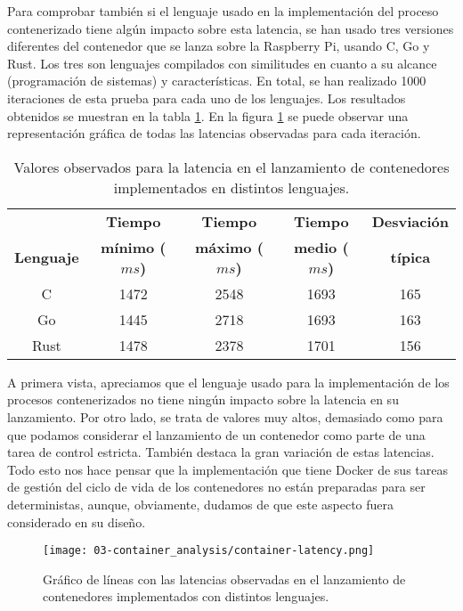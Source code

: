 Para comprobar también si el lenguaje usado en la implementación del proceso
contenerizado tiene algún impacto sobre esta latencia, se han usado tres
versiones diferentes del contenedor que se lanza sobre la Raspberry Pi, usando
C, Go y Rust. Los tres son lenguajes compilados con similitudes en cuanto a su
alcance (programación de sistemas) y características. En total, se han realizado
1000 iteraciones de esta prueba para cada uno de los lenguajes. Los resultados
obtenidos se muestran en la tabla \ref{tab:03-container_latency}. En la figura
\ref{fig:03-container_latency} se puede observar una representación gráfica de
todas las latencias observadas para cada iteración.

\begin{table}[H]
    \centering
    \begin{tabular}{ |c|c|c|c|c| }
        \hline
                          & \textbf{Tiempo}        & \textbf{Tiempo}        & \textbf{Tiempo}       & \textbf{Desviación} \\
        \textbf{Lenguaje} & \textbf{mínimo ($ms$)} & \textbf{máximo ($ms$)} & \textbf{medio ($ms$)} & \textbf{típica}     \\
        \hline
        C                 & 1472                   & 2548                   & 1693                  & 165                 \\
        \hline
        Go                & 1445                   & 2718                   & 1693                  & 163                 \\
        \hline
        Rust              & 1478                   & 2378                   & 1701                  & 156                 \\
        \hline
    \end{tabular}
    \caption{Valores observados para la latencia en el lanzamiento de
        contenedores implementados en distintos lenguajes.}
    \label{tab:03-container_latency}
\end{table}

A primera vista, apreciamos que el lenguaje usado para la implementación de los
procesos contenerizados no tiene ningún impacto sobre la latencia en su
lanzamiento. Por otro lado, se trata de valores muy altos, demasiado como para
que podamos considerar el lanzamiento de un contenedor como parte de una tarea
de control estricta. También destaca la gran variación de estas latencias. Todo esto
nos hace pensar que la implementación que tiene Docker de sus tareas de gestión
del ciclo de vida de los contenedores no están preparadas para ser
deterministas, aunque, obviamente, dudamos de que este aspecto fuera considerado
en su diseño.

\begin{figure}
    \centering
    \texttt{[image: 03-container\_analysis/container-latency.png]}
    \caption{Gráfico de líneas con las latencias observadas en el lanzamiento de
        contenedores implementados con distintos lenguajes.}
    \label{fig:03-container_latency}
\end{figure}